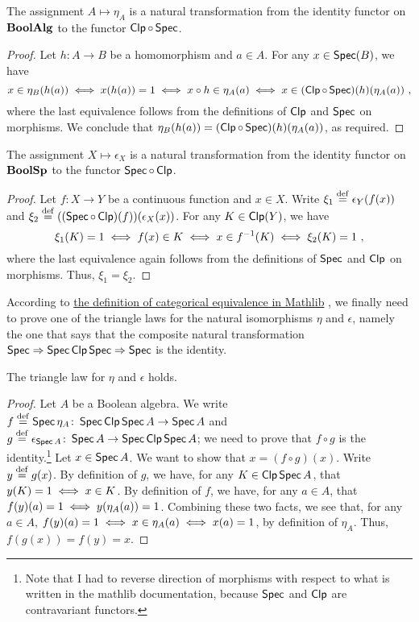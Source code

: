 \documentclass[a4paper,10pt]{article}
\numberwithin{theorem}{section}
\newcommand{\docref}[3]{%
    \href{%
        https://leanprover-community.github.io/mathlib4_docs/Mathlib/#1.html\##2%
    }{#3}%
}
\begin{document}
\begin{proposition}\label{etanat}
    The assignment $A \mapsto \eta_A$ is a natural transformation from the
    identity functor on $\mathbf{BoolAlg}$ to the functor $\operatorname*{\mathsf{Clp}} \circ \operatorname*{\mathsf{Spec}}$.
\end{proposition}
\begin{proof}
    Let $h \colon A \to B$ be a homomorphism and $a \in A$. For any $x \in
    \operatorname*{\mathsf{Spec}}(B)$, we have
    \[ x \in \eta_B(h(a)) \iff x(h(a)) = 1 \iff x \circ h \in \eta_A(a) \iff
    x \in (\operatorname*{\mathsf{Clp}} \circ \operatorname*{\mathsf{Spec}})(h)(\eta_A(a)) \ , \]
    where the last equivalence follows from the definitions of $\operatorname*{\mathsf{Clp}}$ and
    $\operatorname*{\mathsf{Spec}}$ on morphisms. We conclude that $\eta_B(h(a)) = (\operatorname*{\mathsf{Clp}} \circ
    \operatorname*{\mathsf{Spec}})(h)(\eta_A(a))$, as required.
\end{proof}

\begin{proposition}\label{epsilonnat}
    The assignment $X \mapsto \epsilon_X$ is a natural transformation from the
    identity functor on $\mathbf{BoolSp}$ to the functor $\operatorname*{\mathsf{Spec}} \circ \operatorname*{\mathsf{Clp}}$.
\end{proposition}
\begin{proof}
    Let $f \colon X \to Y$ be a continuous function and $x \in X$. Write $\xi_1
    \stackrel{\mathrm{def}}{=} \epsilon_Y(f(x))$ and $\xi_2 \stackrel{\mathrm{def}}{=} ((\operatorname*{\mathsf{Spec}} \circ
    \operatorname*{\mathsf{Clp}})(f))(\epsilon_X(x))$. For any $K \in \operatorname*{\mathsf{Clp}}(Y)$, we have
    \[ \xi_1(K) = 1 \iff f(x) \in K \iff x \in f^{-1}(K) \iff
    \xi_2(K) = 1 \ , \]
    where the last equivalence again follows from the definitions of $\operatorname*{\mathsf{Spec}}$
    and $\operatorname*{\mathsf{Clp}}$ on morphisms. Thus, $\xi_1 = \xi_2$.
\end{proof}

According to
\docref{CategoryTheory/Equivalence}{CategoryTheory.Equivalence}{the
definition of categorical equivalence in Mathlib}, we finally need to prove one
of the triangle laws for the natural isomorphisms $\eta$ and $\epsilon$, namely
the one that says that the composite natural transformation $\operatorname*{\mathsf{Spec}} \Rightarrow
\operatorname*{\mathsf{Spec}} \operatorname*{\mathsf{Clp}} \operatorname*{\mathsf{Spec}} \Rightarrow \operatorname*{\mathsf{Spec}}$ is the identity.
\begin{proposition}\label{triangle}
    The triangle law for $\eta$ and $\epsilon$ holds. 
\end{proposition}
\begin{proof}
    Let $A$ be a Boolean algebra. We write $f \stackrel{\mathrm{def}}{=} \operatorname*{\mathsf{Spec}} \eta_A \colon \operatorname*{\mathsf{Spec}}
    \operatorname*{\mathsf{Clp}} \operatorname*{\mathsf{Spec}} A \to \operatorname*{\mathsf{Spec}} A$ and $g \stackrel{\mathrm{def}}{=} \epsilon_{\operatorname*{\mathsf{Spec}} A} \colon \operatorname*{\mathsf{Spec}} A
    \to \operatorname*{\mathsf{Spec}} \operatorname*{\mathsf{Clp}} \operatorname*{\mathsf{Spec}} A$; we need to prove that $f \circ g$ is the
    identity.\footnote{
        Note that I had to reverse direction of morphisms with respect to what
        is written in the mathlib documentation, because $\operatorname*{\mathsf{Spec}}$ and $\operatorname*{\mathsf{Clp}}$ are
        contravariant functors.}
    Let $x \in \operatorname*{\mathsf{Spec}} A$. We want to show that $x = (f \circ g)(x)$.  Write $y
    \stackrel{\mathrm{def}}{=} g(x)$. By definition of $g$, we have, for any $K \in \operatorname*{\mathsf{Clp}} \operatorname*{\mathsf{Spec}} A$,
    that $y(K) = 1 \iff x \in K$. By definition of $f$, we have, for any $a
    \in A$, that $f(y)(a) = 1 \iff y(\eta_A(a)) = 1$. Combining these two
    facts, we see that, for any $a \in A$, $f(y)(a) = 1 \iff x \in \eta_A(a)
    \iff x(a) = 1$, by definition of $\eta_A$. Thus, $f(g(x)) = f(y) = x$.
\end{proof}
\end{document}
